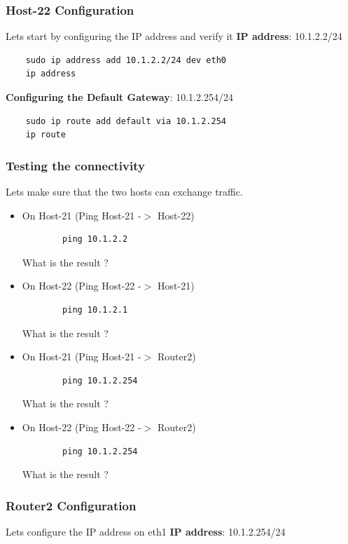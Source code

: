 \subsubsection{Host-22 Configuration}
Lets start by configuring the IP address and verify it
\textbf{IP address}: 10.1.2.2/24

\begin{verbatim}
    sudo ip address add 10.1.2.2/24 dev eth0
    ip address
\end{verbatim}

\textbf{Configuring the Default Gateway}: 10.1.2.254/24

\begin{verbatim}
    sudo ip route add default via 10.1.2.254
    ip route
\end{verbatim}

\subsubsection{Testing the connectivity}
Lets make sure that the two hosts can exchange traffic.
\newline
\begin{itemize}
	\item On Host-21 (Ping Host-21 -$>$ Host-22)
	\begin{verbatim}
	    ping 10.1.2.2
	\end{verbatim}

	What is the result ?
	\item On Host-22 (Ping Host-22 -$>$ Host-21)
	\begin{verbatim}
	    ping 10.1.2.1
	\end{verbatim}

	What is the result ?
	\item On Host-21 (Ping Host-21 -$>$ Router2)
	\begin{verbatim}
	    ping 10.1.2.254
	\end{verbatim}

	What is the result ?
	\item On Host-22 (Ping Host-22 -$>$ Router2)
	\begin{verbatim}
	    ping 10.1.2.254
	\end{verbatim}

	What is the result ?
\end{itemize}


\subsubsection{Router2 Configuration}
Lets configure the IP address on eth1
\textbf{IP address}: 10.1.2.254/24

